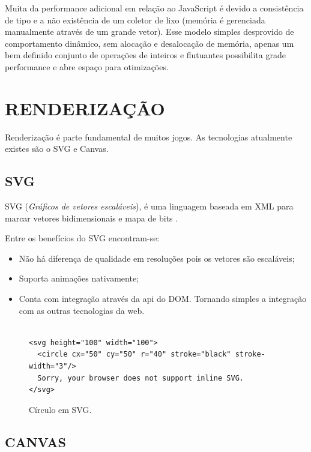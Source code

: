 \documentclass[
12pt,
a4paper,
portuges,
draft
]{report}
\begin{document}
Muita da performance adicional em relação ao JavaScript é devido
a consistência de tipo e a não existência de um coletor de lixo
(memória é gerenciada manualmente através de um grande vetor). Esse
modelo simples desprovido de comportamento dinâmico, sem alocação
e desalocação de memória, apenas um bem definido conjunto de
operações de inteiros e flutuantes possibilita grade performance e
abre espaço para otimizações.


\section{RENDERIZAÇÃO}

Renderização é parte fundamental de muitos jogos. As tecnologias atualmente existes são o SVG e Canvas.

\subsection{SVG}
SVG (\textit{Gráficos de vetores escaláveis}), é uma linguagem baseada em XML para marcar vetores bidimensionais e mapa de bits \autocite{html5mostwanted}.


Entre os benefícios do SVG encontram-se:

\begin{itemize}
\item Não há diferença de qualidade em resoluções pois os vetores são escaláveis;
\item Suporta animações nativamente;
\item Conta com integração através da api do DOM. Tornando simples a integração com as outras tecnologias da web.
\end{itemize}

\begin{figure}
\centering
\begin{verbatim}

<svg height="100" width="100">
  <circle cx="50" cy="50" r="40" stroke="black" stroke-width="3"/>
  Sorry, your browser does not support inline SVG.
</svg>

\end{verbatim}
\caption{Círculo em SVG.}
\end{figure}

\subsection{CANVAS}
\end{document}
